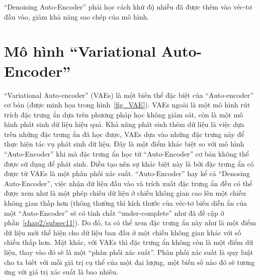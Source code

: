     ``Denoising Auto-Encoder'' phải học cách khử độ nhiễu đã được thêm vào véc-tơ đầu vào,
    giảm khả năng sao chép của mô hình.






\section{Mô hình ``Variational Auto-Encoder''} \label{chap2/sec2}
        ``Variational Auto-encoder'' (VAEs) là một biến thể đặc biệt của ``Auto-encoder'' cơ bản (được minh họa trong hình~\ref{fig_VAE}). VAEs ngoài là một mô hình rút trích đặc trưng ẩn dựa trên phương pháp học không giám sát, còn là một mô hình phát sinh dữ liệu hiệu quả. Khả năng phát sinh thêm dữ liệu là việc dựa trên những đặc trưng ẩn đã học được, VAEs dựa vào những đặc trưng này để thực hiện tác vụ phát sinh dữ liệu. Đây là một điểm khác biệt so với mô hình ``Auto-Encoder'' khi mà đặc trưng ẩn học từ ``Auto-Encoder'' cơ bản không thể được sử dụng để phát sinh. Điều tạo nên sự khác biệt này là bởi đặc trưng ẩn có được từ VAEs là một phân phối xác suất. ``Auto-Encoder'' hay kể cả ``Denosing Auto-Encoder'', việc nhận dữ liệu đầu vào và trích xuất đặc trưng ẩn đều có thể được xem như là một phép chiếu dữ liệu ở chiều không gian cao lên một chiều không gian thấp hơn (thông thường thì kích thước của véc-tơ biểu diễn ẩn của một ``Auto-Encoder'' sẽ có tính chất ``under-complete'' như đã đề cập ở phần~\ref{chap2/subsec11}). Do đó, ta có thể xem đặc trưng ẩn này như là một điểm dữ liệu mới thể hiện cho dữ liệu ban đầu ở một chiều không gian khác với số chiều thấp hơn. Mặt khác, với VAEs thì đặc trưng ẩn không còn là một điểm dữ liệu, thay vào đó sẽ là một ``phân phối xác suất''. Phân phối xác suất là quy luật cho ta biết với mỗi giá trị cụ thể của một đại lượng, một biến số nào đó sẽ tương ứng với giá trị xác suất là bao nhiêu. 
    
